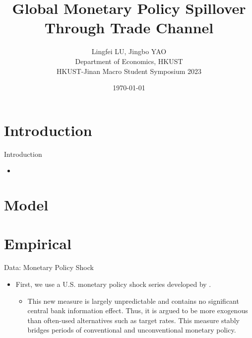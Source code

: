 \documentclass[10pt]{beamer}
\title[Monetary Policy Spillover Through Trade Channel]{Global Monetary Policy Spillover Through Trade Channel}
\author[Yao\&Lu (2023)]{\large Lingfei LU, Jingbo YAO \\ \vspace{0.5cm} Department of Economics, HKUST \\ \vspace{0.5cm} HKUST-Jinan Macro Student Symposium 2023}
\date{\today}
\begin{document}
	
    \begin{frame}[plain]
	\maketitle {}
    \end{frame}


\section{Introduction}

\begin{frame}{Introduction}
	\begin{itemize}
		\item 
	\end{itemize}
\end{frame}

\section{Model}

\section{Empirical}

\begin{frame}{Data: Monetary Policy Shock}
    \begin{itemize}
        \item First, we use a U.S. monetary policy shock series developed by \cite{brw2021}.
        \begin{itemize}
            \item This new measure is largely unpredictable and contains no significant central bank information effect. Thus, it is argued to be more exogenous than often-used alternatives such as target rates. This measure stably bridges periods of conventional and unconventional monetary policy.
        \end{itemize}
    \end{itemize}
\end{frame}
\end{document}
